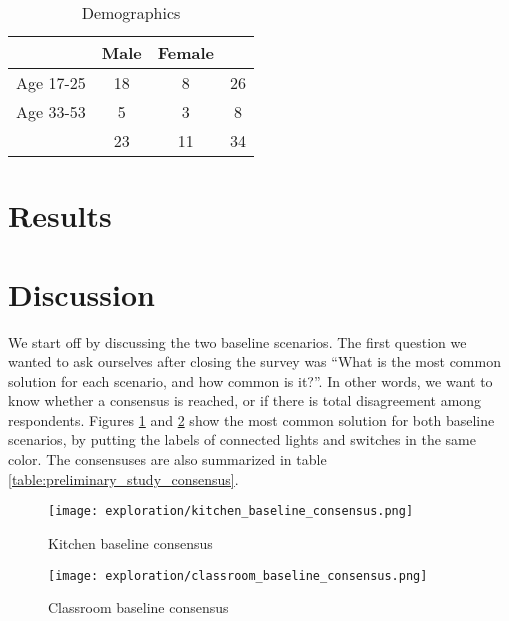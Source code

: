         \begin{table}
        \centering
            \begin{tabular}{|c|c c|c|} 
            \hline
                      & Male & Female &    \\
            \hline
            Age 17-25 &   18 &      8 & 26 \\
            Age 33-53 &    5 &      3 &  8 \\
            \hline
                      &   23 &     11 & 34 \\
            \hline
            \end{tabular}
        \caption{Demographics}
        \label{table:explor:demographics}
        \end{table}

\section{Results} \label{sec:explor:results}

\section{Discussion} \label{sec:explor:discussion}
We start off by discussing the two baseline scenarios. The first question we wanted to ask ourselves after closing the survey was ``What is the most common solution for each scenario, and how common is it?''. In other words, we want to know whether a consensus is reached, or if there is total disagreement among respondents. Figures \ref{fig:preliminary_study_kitchen_baseline_consensus} and \ref{fig:preliminary_study_classroom_baseline_consensus} show the most common solution for both baseline scenarios, by putting the labels of connected lights and switches in the same color. The consensuses are also summarized in table \ref{table:preliminary_study_consensus}.

\begin{figure}
    \centering
    \texttt{[image: exploration/kitchen\_baseline\_consensus.png]}
    \caption{Kitchen baseline consensus}
    \label{fig:preliminary_study_kitchen_baseline_consensus}
\end{figure}

\begin{figure}
    \centering
    \texttt{[image: exploration/classroom\_baseline\_consensus.png]}
    \caption{Classroom baseline consensus}
    \label{fig:preliminary_study_classroom_baseline_consensus}
\end{figure}

